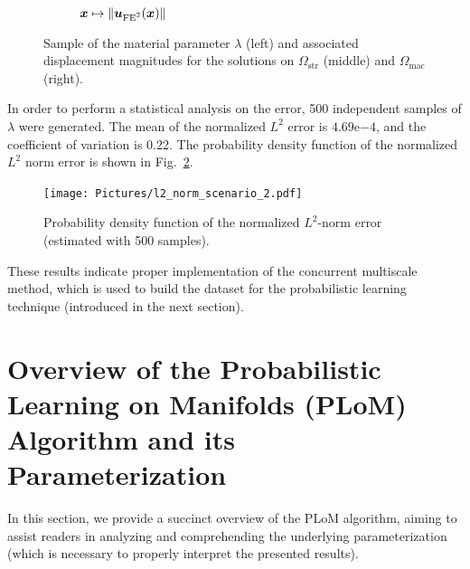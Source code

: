 \begin{figure}[!ht]
\begin{subfigure}[b]{0.33\textwidth}
        \caption{${\boldsymbol{x}} \mapsto \lVert {\boldsymbol{u}}_\text{FE$^2$}({\boldsymbol{x}})\rVert$}
    \end{subfigure}
    \caption{Sample of the material parameter $\lambda$ (left) and associated displacement magnitudes for the solutions on $\Omega_\text{str}$ (middle) and $\Omega_\text{mac}$ (right).}
    \label{fig:validation}
\end{figure}
In order to perform a statistical analysis on the error, 500 independent samples of $\lambda$ were generated. The mean of the normalized $L^2$ error is $4.69\mathrm{e}{-4}$, and the coefficient of variation is 0.22. The probability density function of the normalized $L^2$ norm error is shown in Fig.~\ref{fig:normalized_l2_norm_distribution}.
\begin{figure}[!ht]
    \centering
    \texttt{[image: Pictures/l2\_norm\_scenario\_2.pdf]}
    \caption{Probability density function of the normalized $L^2$-norm error (estimated with 500 samples).}
    \label{fig:normalized_l2_norm_distribution}
\end{figure}
These results indicate proper implementation of the concurrent multiscale method, which is used to build the dataset for the probabilistic learning technique (introduced in the next section).

\section{Overview of the Probabilistic Learning on Manifolds (PLoM) Algorithm and its Parameterization}
\label{sec:PLoM}
In this section, we provide a succinct overview of the PLoM algorithm, aiming to assist readers in analyzing and comprehending the underlying parameterization (which is necessary to properly interpret the presented results).

